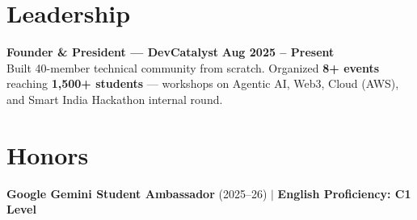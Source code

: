 \documentclass[letterpaper,10pt]{article}
\begin{document}
\section{Leadership}
\textbf{Founder \& President — DevCatalyst} \hfill \textbf{Aug 2025 -- Present} \\
Built 40-member technical community from scratch. Organized \textbf{8+ events} reaching \textbf{1,500+ students} — workshops on Agentic AI, Web3, Cloud (AWS), and Smart India Hackathon internal round.

\section{Honors}
\textbf{Google Gemini Student Ambassador} (2025--26) \quad $\mid$ \quad \textbf{English Proficiency: C1 Level}
\end{document}
